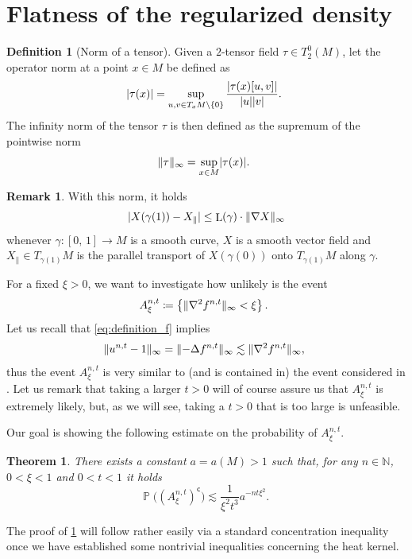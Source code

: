 \documentclass[JEP,XML,SOM,Unicode]{cedram}
\newcounter{results}[section]
\theoremstyle{plain}
\newtheorem{theorem}[results]{Theorem}
\theoremstyle{definition}
\newtheorem{remark}[results]{Remark}
\newtheorem{definition}[results]{Definition}
\numberwithin{equation}{section}
\newcommand{\NN}{\ensuremath{\mathbb N}}
\renewcommand{\complement}{\ensuremath{\mathsf{c}}}\newcommand{\de}{\ensuremath{\,\mathrm d}}
\newcommand{\defeq}{\ensuremath{\coloneqq}}
\newcommand{\lapl}{\ensuremath{\Delta}}
\newcommand{\bP}[1]{\ensuremath{\operatorname{\mathbb{P}}\bigl(#1\bigr)}}
\newcommand{\cc}[2]{\ensuremath{\left[#1,\,#2\right]}}
\renewcommand{\comma}{\ensuremath{\text{, }}}
\newcommand{\comma}{\ensuremath{\text{, }}}
\newcommand{\fullstop}{\ensuremath{\text{. }}}
\newcommand{\Xpar}{X_{\parallel}}
\DeclareMathOperator{\Length}{L}
\DeclarePairedDelimiter\abs{\lvert}{\rvert}
\DeclarePairedDelimiter\norm{\lVert}{\rVert}
\begin{document}
\section{Flatness of the regularized density}\label{sec:probability}
\begin{definition}[Norm of a tensor]\label{def:tensor_infinity_norm}
Given a $2$-tensor field $\tau\in T^0_2(M)$, let the operator norm at a point $x\in M$ be defined as
\begin{equation*}
\abs{\tau(x)} = \sup_{u,v\in T_xM\setminus\{0\}} \frac{\abs{\tau(x)[u,v]}}{\abs{u}\abs{v}} \fullstop
\end{equation*}
The infinity norm of the tensor $\tau$ is then defined as the supremum of the pointwise norm
\begin{equation*}
\norm{\tau}_\infty = \sup_{x\in M}\abs{\tau(x)}\fullstop
\end{equation*}
\end{definition}
\begin{remark}
With this norm, it holds
\begin{equation*}
\abs{X(\gamma(1))-\Xpar} \le \Length(\gamma)\cdot\norm{\nabla X}_\infty
\end{equation*}
whenever $\gamma:\cc01\to M$ is a smooth curve, $X$ is a smooth vector field and
$\Xpar\in T_{\gamma(1)}M$ is the parallel transport of $X(\gamma(0))$ onto $T_{\gamma(1)}M$
along $\gamma$.
\end{remark}

For a fixed $\xi>0$, we want to investigate how unlikely is the event
\begin{equation*}
A^{n,t}_\xi \defeq \left\{\norm{\nabla^2 f^{n,t}}_\infty < \xi\right\} \fullstop
\end{equation*}
Let us recall that \cref{eq:definition_f} implies
\begin{equation*}
\norm{u^{n,t}-1}_\infty = \norm{-\lapl f^{n,t}}_\infty\lesssim \norm{\nabla^2 f^{n,t}}_\infty \comma
\end{equation*}
thus the event $A^{n,t}_\xi$ is very similar to (and is contained in) the event considered
in \cite[Prop.\,3.10]{Ambrosio-Stra-Trevisan2018}.
Let us remark that taking a larger $t>0$ will of course assure us that $A^{n,t}_\xi$ is extremely likely, but,
as we will see, taking a $t>0$ that is too large is unfeasible.

Our goal is showing the following estimate on the probability of $A^{n,t}_\xi$.
\begin{theorem}\label{thm:prob_flat_density}
There exists a constant $a=a(M)>1$ such that, for any $n\in\NN$, $0<\xi<1$ and $0<t<1$ it holds
\begin{equation*}
\bP{(A^{n,t}_\xi)^{\complement}}\lesssim\frac1{\xi^2t^3}a^{-nt\xi^2} \fullstop
\end{equation*}
\end{theorem}
The proof of \cref{thm:prob_flat_density} will follow rather easily via a standard
concentration inequality once we have established some nontrivial inequalities
concerning the heat kernel.
\end{document}
